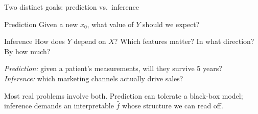 \documentclass[aspectratio=169,11pt]{beamer}
\begin{document}
\begin{frame}{Two distinct goals: prediction vs.\ inference}\label{frm:predinf}
  \begin{block}{Prediction}
    Given a new $x_0$, what value of $Y$ should we expect?
  \end{block}
  \begin{block}{Inference}
    How does $Y$ depend on $X$? Which features matter? In what
    direction? By how much?
  \end{block}
  \begin{numexample}
    \emph{Prediction:} given a patient's measurements, will they
    survive 5 years?\\
    \emph{Inference:} which marketing channels actually drive sales?
  \end{numexample}
  \begin{takeaway}
    Most real problems involve both. Prediction can tolerate a
    black-box model; inference demands an interpretable $\hat f$ whose
    structure we can read off.
  \end{takeaway}
\end{frame}
\end{document}
